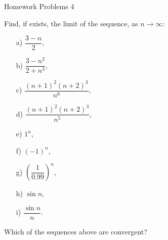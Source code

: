  \begin{center}\begin{large} Homework Problems 4
 \end{large}\end{center}
 \bigskip

\begin{problem}[2 points]
   Find, if exists, the limit of the sequence, as $n\to\infty$:

    \begin{enumerate}
        \item[a) ] $\dfrac{3-n}{2}$,
        
        \item[b) ] $\dfrac{3-n^2}{2+n^3}$,
        
        \item[c) ] $\dfrac{(n+1)^2(n+2)^3}{n^6}$,
        
        \item[d) ] $\dfrac{(n+1)^2(n+2)^3}{n^5}$,
        
        \item[e) ] $1^n$,

        \item[f) ] $(-1)^n$,

        \item[g) ] $\left(\dfrac{1}{0.99}\right)^n$,

        \item[h) ] $\sin {n}$,

        \item[i) ] $\dfrac{\sin {n}}{n}$.

    \end{enumerate}
    Which of the sequences above are convergent?

\end{problem}

\bigskip

